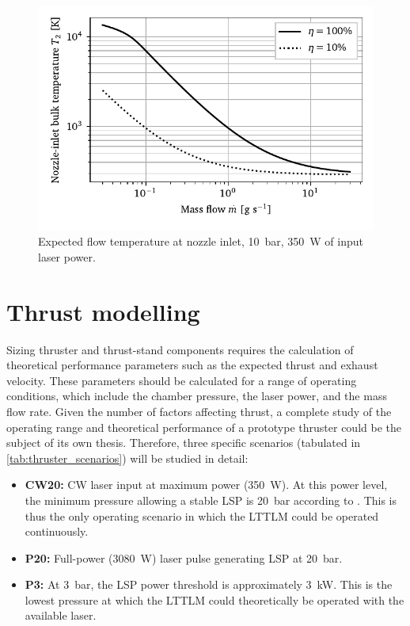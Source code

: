                 \begin{figure}[h]
                    \centering
                    \includegraphics[]{assets/4 models/heat_addition_flowing.pdf}
                    \caption[Expected flow temperature at nozzle inlet]{Expected flow temperature at nozzle inlet, \qty{10}{bar}, \qty{350}{W} of input laser power.}
                    \label{fig:heatdep_flowing}
                \end{figure}
    
    \section{Thrust modelling} \label{sec:model_thrust}
        Sizing thruster and thrust-stand components requires the calculation of theoretical performance parameters such as the expected thrust and exhaust velocity. These parameters should be calculated for a range of operating conditions, which include the chamber pressure, the laser power, and the mass flow rate. Given the number of factors affecting thrust, a complete study of the operating range and theoretical performance of a prototype thruster could be the subject of its own thesis. Therefore, three specific scenarios (tabulated in \autoref{tab:thruster_scenarios}) will be studied in detail:
        \begin{itemize}
            \item \textbf{CW20:} CW laser input at maximum power (\qty{350}{W}). At this power level, the minimum pressure allowing a stable LSP is \qty{20}{bar} according to \textcite{zimakovInteractionNearIRLaser2016}. This is thus the only operating scenario in which the LTTLM could be operated continuously.
            \item \textbf{P20:} Full-power (\qty{3080}{W}) laser pulse generating LSP at \qty{20}{bar}.
            \item \textbf{P3:} At \qty{3}{bar}, the LSP power threshold is approximately \qty{3}{kW}. This is the lowest pressure at which the LTTLM could theoretically be operated with the available laser.
        \end{itemize}

